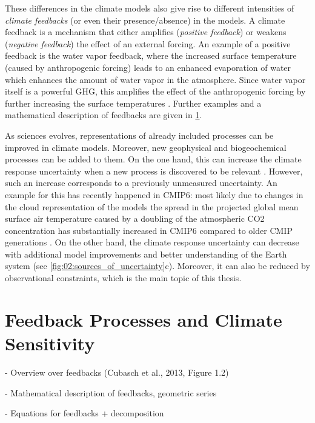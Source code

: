 These differences in the climate models also give rise to different intensities
of \emph{climate feedbacks} (or even their presence/absence) in the models. A
climate feedback is a mechanism that either amplifies (\emph{positive
  feedback}) or weakens (\emph{negative feedback}) the effect of an external
forcing. An example of a positive feedback is the water vapor feedback, where
the increased surface temperature (caused by anthropogenic forcing) leads to an
enhanced evaporation of water which enhances the amount of water vapor in the
atmosphere. Since water vapor itself is a powerful \ac{GHG}, this amplifies the
effect of the anthropogenic forcing by further increasing the surface
temperatures \autocite{Cubasch2013}. Further examples and a mathematical
description of feedbacks are given in
\cref{sec:02:feedbacks_and_climate_sensitivity}.

As sciences evolves, representations of already included processes can be
improved in climate models. Moreover, new geophysical and biogeochemical
processes can be added to them. On the one hand, this can increase the climate
response uncertainty when a new process is discovered to be relevant
. However,
such an increase corresponds to a previously unmeasured uncertainty. An example
for this has recently happened in \acs{CMIP}6: most likely due to changes in
the cloud representation of the models the spread in the projected global mean
surface air temperature caused by a doubling of the atmospheric \ac{CO2}
concentration has substantially increased in \ac{CMIP}6 compared to older
\ac{CMIP} generations \autocite{Zelinka2020}. On the other hand, the climate
response uncertainty can decrease with additional model improvements and better
understanding of the Earth system (see \cref{fig:02:sources_of_uncertainty}c).
Moreover, it can also be reduced by observational constraints, which is the
main topic of this thesis.


\section{Feedback Processes and Climate Sensitivity}
\label{sec:02:feedbacks_and_climate_sensitivity}

- Overview over feedbacks (Cubasch et al., 2013, Figure 1.2)

- Mathematical description of feedbacks, geometric series

- Equations for feedbacks + decomposition

